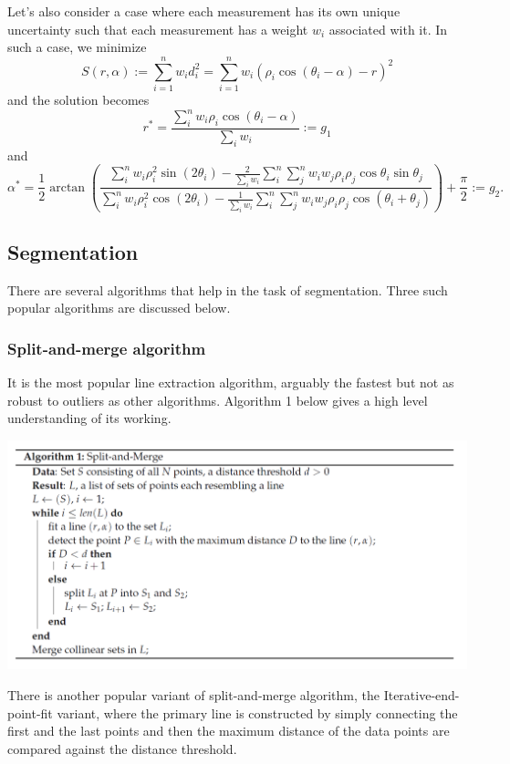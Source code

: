 \documentclass[twoside]{article}
\begin{document}
Let's also consider a case where each measurement has its own unique uncertainty such that each measurement has a weight $w_i$ associated with it. In such a case, we minimize
$$S(r,\alpha) := \sum_{i=1}^n w_id_i^2 = \sum_{i=1}^n w_i(\rho_i \cos(\theta_i - \alpha) - r)^2$$
and the solution becomes \cite{SNS}
$$r^* = \frac{\sum_i^n w_i \rho_i\cos(\theta_i - \alpha)}{\sum_i w_i} := g_1$$ and
$$\alpha^* = \frac{1}{2} \arctan\left(\frac{\sum_i^n w_i \rho_i^2\sin(2\theta_i) - \frac{2}{\sum_i w_i}\sum_i^n\sum_j^n w_i w_j\rho_i \rho_j \cos\theta_i \sin \theta_j}{\sum_i^n w_i \rho_i^2\cos(2\theta_i) - \frac{1}{\sum_i w_i}\sum_i^n\sum_j^n w_i w_j \rho_i \rho_j \cos(\theta_i + \theta_j)}\right) + \frac{\pi}{2} := g_2.$$

\subsection{Segmentation}
There are several algorithms that help in the task of segmentation. Three such popular algorithms are discussed below.
\subsubsection{Split-and-merge algorithm}
It is the most popular line extraction algorithm, arguably the fastest but not as robust to outliers as other algorithms. Algorithm 1 below gives a high level understanding of its working.

\begin{center}
	\includegraphics[width=1\textwidth]{splitandmerge}
\end{center}

There is another popular variant of split-and-merge algorithm, the Iterative-end-point-fit variant, where the primary line is constructed by simply connecting the first and the last points and then the maximum distance of the data points are compared against the distance threshold.
\end{document}
